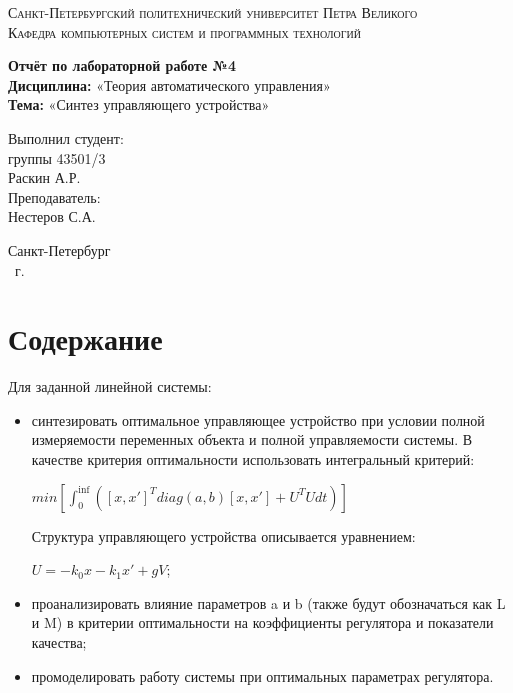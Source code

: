 \documentclass[14pt,a4paper,report]{report}
\makeatletter
\renewcommand{\tableofcontents}{\section*{\contentsname}\@starttoc{toc}}
\renewcommand\chapter{
	\thispagestyle{plain}%
	\@afterindentfalse \secdef\@chapter\@schapter}
\makeatother
\begin{document}
\fontsize{12}{10pt}\selectfont

\begin{titlepage}
	\begin{center}
		\textsc{Санкт-Петербургский политехнический 
			университет Петра Великого\\[5mm]
			Кафедра компьютерных систем и программных технологий}
		
		\vfill
		
		\textbf{Отчёт по лабораторной работе №4}\\[3mm]
			\textbf{Дисциплина:} «Теория автоматического управления»\\[3mm]
			\textbf{Тема:} «Синтез управляющего устройства»\\[50mm]
	\end{center}
	
	\hfill
	\begin{minipage}{.3\textwidth}
		Выполнил студент:\\[2mm]
		группы 43501/3\\[2mm] 
		Раскин А.Р.\\
		[5mm]
		
		Преподаватель:\\[2mm] 
		Нестеров С.А.
	\end{minipage}
	\vfill
	\begin{center}
		Санкт-Петербург\\ \the\year\ г.
	\end{center}
\end{titlepage}

\def\contentsname{Содержание}
\tableofcontents
\newpage

\chapter{Цель работы}
Для заданной линейной системы:

\begin{itemize}
	\item синтезировать оптимальное управляющее устройство при условии полной измеряемости переменных объекта и полной управляемости системы. В качестве критерия оптимальности использовать интегральный критерий:
	
	\begin{center}
		$min[\int_{0}^{\inf}([x,x']^Tdiag(a,b)[x,x']+U^TUdt)]$
	\end{center}
	
	Структура управляющего устройства описывается уравнением:
	
	\begin{center}
		$U=-k_0x-k_1x'+gV$;
	\end{center}
	
	\item проанализировать влияние параметров a и b (также будут обозначаться как L и M) в критерии оптимальности на коэффициенты регулятора и показатели качества;
	\item промоделировать работу системы при оптимальных параметрах регулятора.
\end{itemize}
\end{document}
